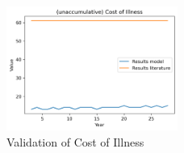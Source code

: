 \begin{figure}[!ht]
	\centering
	\includegraphics[width=0.5\textwidth]{notebooks/coi.png}
	\caption{Validation of Cost of Illness}
	\label{fig:val_coi}
\end{figure}